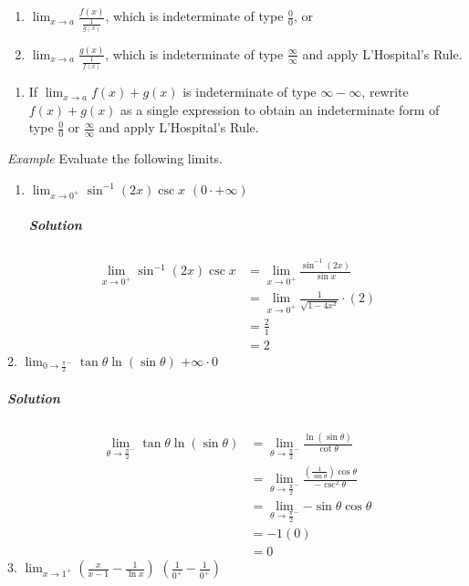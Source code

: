\documentclass[
  letterpaper,
  DIV=11,
  numbers=noendperiod]{scrartcl}
\let\oldsubparagraph\subparagraph
\renewcommand{\subparagraph}[1]{\oldsubparagraph{#1}\mbox{}}
\providecommand{\tightlist}{%
  \setlength{\itemsep}{0pt}\setlength{\parskip}{0pt}}\usepackage{longtable,booktabs,array}
\theoremstyle{plain}
\theoremstyle{remark}
\begin{document}
\begin{enumerate}
\def\labelenumi{(\alph{enumi})}
\tightlist
\item
  \(\displaystyle\lim_{x\to a}{\frac{f(x)}{\frac{1}{g(x)}}}\), which is
  indeterminate of type \(\frac{0}{0}\), or
\item
  \(\displaystyle\lim_{x\to a}{\frac{g(x)}{\frac{1}{f(x)}}}\), which is
  indeterminate of type \(\frac{\infty}{\infty}\) and apply L'Hospital's
  Rule.
\end{enumerate}

\begin{enumerate}
\def\labelenumi{\arabic{enumi}.}
\setcounter{enumi}{1}
\tightlist
\item
  If \(\displaystyle\lim_{x\to a}{f(x)+g(x)}\) is indeterminate of type
  \(\infty - \infty\), rewrite \(f(x)+g(x)\) as a single expression to
  obtain an indeterminate form of type \(\frac{0}{0}\) or
  \(\frac{\infty}{\infty}\) and apply L'Hospital's Rule.
\end{enumerate}

\leavevmode{}%
\emph{Example} Evaluate the following limits.

\begin{enumerate}
\def\labelenumi{\arabic{enumi}.}
\item
  \(\displaystyle\lim_{x\to 0^+}{\sin^{-1} (2x) \csc x}\)
  \((0\cdot +\infty)\)

  \hypertarget{solution-1}{%
  \subparagraph{\texorpdfstring{\emph{Solution}}{Solution}}\label{solution-1}}
\end{enumerate}

\[
\begin{aligned}
\displaystyle\lim_{x\to 0^+}{\sin^{-1} (2x) \csc x} &=\displaystyle\lim_{x\to 0^+}{\frac{\sin^{-1} (2x)}{\sin x}}\\&=\displaystyle\lim_{x\to 0^+}{\frac{1}{\sqrt{1-4x^2}}}\cdot (2) \\&=\frac{2}{1}\\&=2
\end{aligned}
\] 2.
\(\displaystyle\lim_{0\to \frac{\pi}{2}^-}{\tan \theta \ln (\sin \theta)}\)
\(+\infty \cdot 0\)

\hypertarget{solution-2}{%
\subparagraph{\texorpdfstring{\emph{Solution}}{Solution}}\label{solution-2}}

\[
\begin{aligned}
\displaystyle\lim_{\theta\to \frac{\pi}{2}^-}{\tan \theta \ln (\sin \theta)}&=\displaystyle\lim_{\theta \to \frac{\pi}{2}^-}{\frac {\ln (\sin \theta)}{\cot \theta}}\\&=\displaystyle\lim_{\theta\to \frac{\pi}{2}^-}{\frac{\left(\frac {1}{\sin \theta}\right)\cos \theta}{-\csc^2 \theta}}\\&=\displaystyle\lim_{\theta\to \frac{\pi}{2}^-}{-\sin \theta\cos \theta}\\&=-1(0)\\&=0
\end{aligned}
\] 3.
\(\displaystyle\lim_{x\to 1^+}{\left(\frac{x}{x-1}-\frac{1}{\ln x}\right)}\)
\(\left(\frac{1}{0^+}-\frac{1}{0^+}\right)\)
\end{document}
